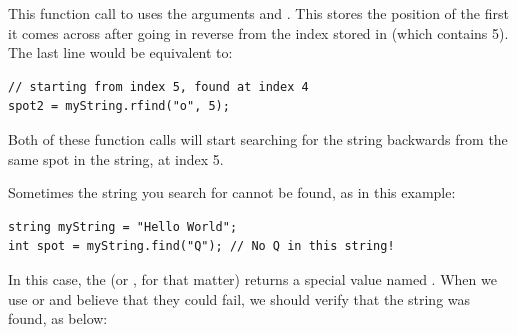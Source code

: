 \noindent This function call to  uses the arguments  and .
This stores the position of the first  it comes across after going in reverse from the index stored in  (which contains 5).
The last line would be equivalent to: \nopagebreak[4]

\noindent\begin{minipage}{\linewidth}\begin{lstlisting}
// starting from index 5, found at index 4
spot2 = myString.rfind("o", 5); 
\end{lstlisting}\end{minipage}

\noindent Both of these function calls will start searching for the string  backwards from the same spot in the string, at index 5. 

Sometimes the string you search for cannot be found, as in this example:

\noindent\begin{minipage}{\linewidth}\begin{lstlisting}
string myString = "Hello World";
int spot = myString.find("Q"); // No Q in this string!
\end{lstlisting}\end{minipage}

\noindent In this case, the  (or , for that matter) returns a special value named .
When we use  or  and believe that they could fail, we should verify that the string was found, as below:

